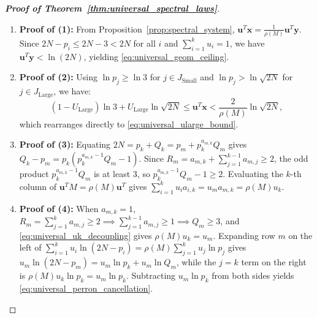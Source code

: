 \documentclass[11pt,a4paper]{article}
\theoremstyle{definition}
\begin{document}
\begin{proof}[\textbf{Proof of Theorem~\ref{thm:universal_spectral_laws}}]
\begin{enumerate}
    \item \textbf{Proof of (1):} From Proposition~\ref{prop:spectral_system}, $\mathbf{u}^T\mathbf{x} = \frac{1}{\rho(M)}\mathbf{u}^T\mathbf{y}$. Since $2N - p_i \le 2N - 3 < 2N$ for all $i$ and $\sum_{i=1}^k u_i = 1$, we have $\mathbf{u}^T\mathbf{y} < \ln(2N)$, yielding \eqref{eq:universal_geom_ceiling}.
    \item \textbf{Proof of (2):} Using $\ln p_j \ge \ln 3$ for $j \in J_{\text{Small}}$ and $\ln p_j > \ln\sqrt{2N}$ for $j \in J_{\text{Large}}$, we have:
    \[
    (1 - U_{\text{Large}})\ln 3 + U_{\text{Large}}\ln\sqrt{2N} \le \mathbf{u}^T\mathbf{x} < \frac{2}{\rho(M)}\ln\sqrt{2N},
    \]
    which rearranges directly to \eqref{eq:universal_ularge_bound}.
    \item \textbf{Proof of (3):} Equating $2N = p_k + Q_k = p_m + p_k^{a_{m,k}} Q_m$ gives $Q_k - p_m = p_k(p_k^{a_{m,k}-1} Q_m - 1)$. Since $R_m = a_{m,k} + \sum_{j=1}^{k-1} a_{m,j} \ge 2$, the odd product $p_k^{a_{m,k}-1} Q_m$ is at least $3$, so $p_k^{a_{m,k}-1} Q_m - 1 \ge 2$. Evaluating the $k$-th column of $\mathbf{u}^T M = \rho(M)\mathbf{u}^T$ gives $\sum_{i=1}^k u_i a_{i,k} = u_m a_{m,k} = \rho(M) u_k$.
    \item \textbf{Proof of (4):} When $a_{m,k} = 1$, $R_m = \sum_{j=1}^k a_{m,j} \ge 2 \implies \sum_{j=1}^{k-1} a_{m,j} \ge 1 \implies Q_m \ge 3$, and \eqref{eq:universal_uk_decoupling} gives $\rho(M) u_k = u_m$. Expanding row $m$ on the left of $\sum_{i=1}^k u_i \ln(2N - p_i) = \rho(M)\sum_{j=1}^k u_j \ln p_j$ gives $u_m \ln(2N - p_m) = u_m \ln p_k + u_m \ln Q_m$, while the $j=k$ term on the right is $\rho(M) u_k \ln p_k = u_m \ln p_k$. Subtracting $u_m \ln p_k$ from both sides yields \eqref{eq:universal_perron_cancellation}.
\end{enumerate}
\end{proof}
\end{document}
